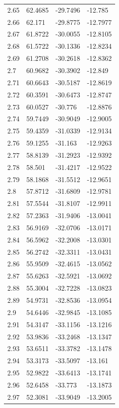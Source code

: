 \begin{tabular}{llll}
2.65 & 62.4685 & -29.7496 & -12.785 \\
2.66 & 62.171 & -29.8775 & -12.7977 \\
2.67 & 61.8722 & -30.0055 & -12.8105 \\
2.68 & 61.5722 & -30.1336 & -12.8234 \\
2.69 & 61.2708 & -30.2618 & -12.8362 \\
2.7 & 60.9682 & -30.3902 & -12.849 \\
2.71 & 60.6643 & -30.5187 & -12.8619 \\
2.72 & 60.3591 & -30.6473 & -12.8747 \\
2.73 & 60.0527 & -30.776 & -12.8876 \\
2.74 & 59.7449 & -30.9049 & -12.9005 \\
2.75 & 59.4359 & -31.0339 & -12.9134 \\
2.76 & 59.1255 & -31.163 & -12.9263 \\
2.77 & 58.8139 & -31.2923 & -12.9392 \\
2.78 & 58.501 & -31.4217 & -12.9522 \\
2.79 & 58.1868 & -31.5512 & -12.9651 \\
2.8 & 57.8712 & -31.6809 & -12.9781 \\
2.81 & 57.5544 & -31.8107 & -12.9911 \\
2.82 & 57.2363 & -31.9406 & -13.0041 \\
2.83 & 56.9169 & -32.0706 & -13.0171 \\
2.84 & 56.5962 & -32.2008 & -13.0301 \\
2.85 & 56.2742 & -32.3311 & -13.0431 \\
2.86 & 55.9509 & -32.4615 & -13.0562 \\
2.87 & 55.6263 & -32.5921 & -13.0692 \\
2.88 & 55.3004 & -32.7228 & -13.0823 \\
2.89 & 54.9731 & -32.8536 & -13.0954 \\
2.9 & 54.6446 & -32.9845 & -13.1085 \\
2.91 & 54.3147 & -33.1156 & -13.1216 \\
2.92 & 53.9836 & -33.2468 & -13.1347 \\
2.93 & 53.6511 & -33.3782 & -13.1478 \\
2.94 & 53.3173 & -33.5097 & -13.161 \\
2.95 & 52.9822 & -33.6413 & -13.1741 \\
2.96 & 52.6458 & -33.773 & -13.1873 \\
2.97 & 52.3081 & -33.9049 & -13.2005 \\

\end{tabular}
